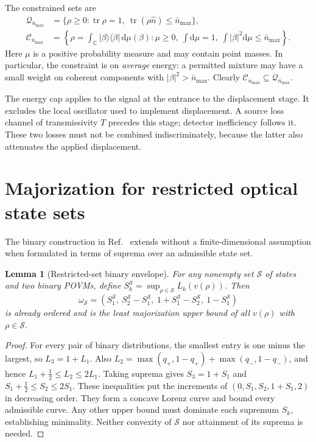 \documentclass[11pt,a4paper]{article}
\newcommand{\tr}{\operatorname{tr}}
\newcommand{\Cset}{\mathcal C}
\newcommand{\Qset}{\mathcal Q}
\newcommand{\nbar}{\bar n_{\max}}
\newcommand{\ket}[1]{\lvert #1\rangle}
\newcommand{\bra}[1]{\langle #1\rvert}
\newcommand{\abs}[1]{\lvert #1\rvert}
\newcommand{\dd}{\mathrm d}
\newtheorem{lemma}{Lemma}
\begin{document}
The constrained sets are
\begin{align}
 \Qset_{\nbar}&=\{\rho\geq0:\tr\rho=1,\ \tr(\rho\hat n)\leq\nbar\},\label{eq:qset}\\
 \Cset_{\nbar}&=\left\{\rho=\int_{\mathbb C}\ket\beta\bra\beta\,\dd\mu(\beta):
 \mu\geq0,\ \int\dd\mu=1,\ \int\abs\beta^2\dd\mu\leq\nbar\right\}.
 \label{eq:cset}
\end{align}
Here $\mu$ is a positive probability measure and may contain point masses.
In particular, the constraint is on \emph{average} energy: a permitted mixture
may have a small weight on coherent components with $\abs\beta^2>\nbar$.
Clearly $\Cset_{\nbar}\subseteq\Qset_{\nbar}$.

The energy cap applies to the signal at the entrance to the displacement stage.
It excludes the local oscillator used to implement displacement. A source loss
channel of transmissivity $T$ precedes this stage; detector inefficiency follows
it. These two losses must not be combined indiscriminately, because the latter
also attenuates the applied displacement.

\section{Majorization for restricted optical state sets}
The binary construction in Ref.~\cite{ZhuManuscript} extends without a
finite-dimensional assumption when formulated in terms of suprema over an
admissible state set.

\begin{lemma}[Restricted-set binary envelope]\label{lem:binary}
For any nonempty set $\mathcal S$ of states and two binary POVMs, define
$S_k^{\mathcal S}=\sup_{\rho\in\mathcal S}L_k(v(\rho))$.
Then
\begin{equation}
 \omega_{\mathcal S}=
 (S_1^{\mathcal S},\ S_2^{\mathcal S}-S_1^{\mathcal S},\
  1+S_1^{\mathcal S}-S_2^{\mathcal S},\ 1-S_1^{\mathcal S})
 \label{eq:omega}
\end{equation}
is already ordered and is the least majorization upper bound of all
$v(\rho)$ with $\rho\in\mathcal S$.
\end{lemma}
\begin{proof}
For every pair of binary distributions, the smallest entry is one minus the
largest, so $L_3=1+L_1$. Also
$L_2=\max(q_+,1-q_+)+\max(q_-,1-q_-)$, and hence
$L_1+\tfrac12\leq L_2\leq2L_1$. Taking suprema gives
$S_3=1+S_1$ and $S_1+\tfrac12\leq S_2\leq2S_1$.
These inequalities put the increments of $(0,S_1,S_2,1+S_1,2)$ in decreasing
order. They form a concave Lorenz curve and bound every admissible curve.
Any other upper bound must dominate each supremum $S_k$, establishing minimality.
Neither convexity of $\mathcal S$ nor attainment of its suprema is needed.
\end{proof}
\end{document}
